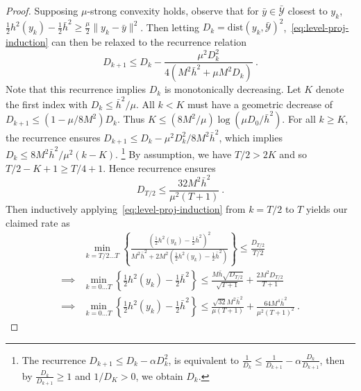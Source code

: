 \documentclass[10pt,a4paper]{amsart}
\begin{document}
\begin{proof}
Supposing $\mu$-strong convexity holds, observe that for $\bar y\in \mathcal{\bar Y}$ closest to $y_k$, $\frac{1}{2}h^2(y_k) - \frac{1}{2}\bar h^2 \geq \frac{\mu}{2}\|y_k-\bar y\|^2$. Then letting $D_k = \mathrm{dist}(y_k, \mathcal{\bar Y})^2$,~\eqref{eq:level-proj-induction} can then be relaxed to the recurrence relation
$$ D_{k+1} \leq D_k - \frac{\mu^2 D_k^2}{4(M^2\bar h^2 + \mu M^2D_k)} \ .$$
Note that this recurrence implies $D_k$ is monotonically decreasing. Let $K$ denote the first index with $D_k \leq \bar h^2/\mu$. All $k<K$ must have a geometric decrease of $D_{k+1}\leq (1-\mu/8M^2 )D_k$. Thus $K\leq (8M^2/\mu) \log(\mu D_0/\bar h^2)$. For all $k\geq K$, the recurrence ensures $D_{k+1}\leq D_k - \mu^2 D_k^2/8M^2\bar h^2$, which implies $D_k \leq 8M^2\bar h^2/\mu^2(k-K)$. \footnote{The recurrence $D_{k+1} \leq D_k - \alpha D_k^2$, is equivalent to $\frac{1}{D_k} \leq \frac{1}{D_{k+1}}-\alpha \frac{D_k}{D_{k+1}}$, then by $\frac{D_k}{D_{k+1}}\geq 1$ and $1/D_K>0$, we obtain $D_k$.}
By assumption, we have $T/2 > 2K$ and so $T/2-K+1 \geq T/4 +1 $. Hence recurrence ensures
$$ D_{T/2} \leq \frac{32 M^2\bar h^2}{\mu^2(T+1)} \ . $$
Then inductively applying~\eqref{eq:level-proj-induction} from $k=T/2$ to $T$ yields our claimed rate as
\begin{align*}
    & \min_{k=T/2\dots T}\left\{\frac{\left(\frac{1}{2}h^2(y_k) - \frac{1}{2}\bar h^2\right)^2}{M^2\bar h^2 + 2M^2\left(\frac{1}{2}h^2(y_k) - \frac{1}{2}\bar h^2\right)}\right\} \leq \frac{D_{T/2}}{T/2} \\
    \implies & \min_{k=0\dots T}\left\{\frac{1}{2}h^2(y_k) - \frac{1}{2}\bar h^2\right\} \leq \frac{M\bar h\sqrt{D_{T/2}}}{\sqrt{T+1}} + \frac{2M^2D_{T/2}}{T+1} \\
    \implies & \min_{k=0\dots T}\left\{\frac{1}{2}h^2(y_k) - \frac{1}{2}\bar h^2\right\} \leq \frac{\sqrt{32}M^2\bar h^2}{\mu (T+1)} + \frac{64M^4\bar h^2}{\mu^2(T+1)^2} \ . 
\end{align*}
\end{proof}
\end{document}
